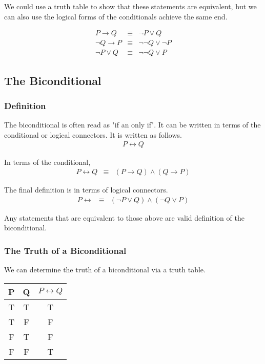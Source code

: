 \documentclass{article}
\begin{document}
We could use a truth table to show that these statements are equivalent,
but we can also use the logical forms of the conditionals achieve the same end.

\begin{eqnarray} \nonumber
    P \rightarrow Q &\equiv& \neg P \lor Q \\ \nonumber
    \neg Q \rightarrow P &\equiv& \neg \neg Q \lor \neg P \\ \nonumber
    \neg P \lor Q &\equiv& \neg \neg Q \lor P
\end{eqnarray}

\subsection{The Biconditional}
\subsubsection{Definition}
The biconditional is often read as "if an only if". It can be written in terms
of the conditional or logical connectors. It is written as follows.
\begin{eqnarray} \nonumber
    P \leftrightarrow Q
\end{eqnarray}

In terms of the conditional,
\begin{eqnarray}
    P \leftrightarrow Q  &\equiv& (P \rightarrow Q) \land (Q \rightarrow P)
\end{eqnarray}

The final definition is in terms of logical connectors.
\begin{eqnarray}
    P \leftrightarrow &\equiv& (\neg P \lor Q) \land (\neg Q \lor P)
\end{eqnarray}

\noindent Any statements that are equivalent to those above are valid definition of
the biconditional.

\subsubsection{The Truth of a Biconditional}
We can determine the truth of a biconditional via a truth table.

\begin{center}
    \begin{tabular}{c | c | c}
        P & Q & $P \leftrightarrow Q$ \\
        \hline
        T & T & T \\
        T & F & F \\
        F & T & F \\
        F & F & T \\
    \end{tabular}
\end{center}
\end{document}
